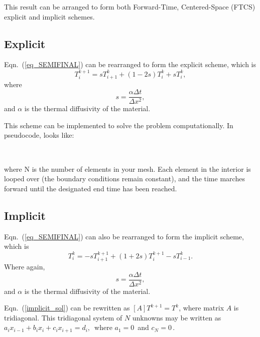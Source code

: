 \documentclass[twocolumn,10pt]{asme2ej}
\begin{document}
This result can be arranged to form both Forward-Time, Centered-Space (FTCS) explicit and implicit schemes.

\subsection{Explicit}
Eqn.~(\ref{eq_SEMIFINAL}) can be rearranged to form the explicit scheme, which is
\begin{equation}
T_i^{k+1} = sT_{i+1}^k +(1- 2s)T_i^k + sT_{i}^k,
\end{equation}
\noindent where
\begin{equation}
s = \frac{\alpha \Delta t}{\Delta x^2},
\end{equation}
\noindent and $\alpha$ is the thermal diffusivity of the material.

This scheme can be implemented to solve the problem computationally. In pseudocode, looks like: \\
\begin{algorithmic}
    \EndFor
\EndWhile \\
\end{algorithmic}
\noindent where N is the number of elements in your mesh. Each element in the interior is looped over (the boundary conditions remain constant), and the time marches forward until the designated end time has been reached.

\subsection{Implicit}
Eqn.~(\ref{eq_SEMIFINAL}) can also be rearranged to form the implicit scheme, which is
\begin{equation}
\label{implicit_sol}
T_i^k = -sT_{i+1}^{k+1} +(1+2s)T_i^{k+1} - sT_{i-1}^k.
\end{equation}
\noindent Where again,
\begin{equation}
s = \frac{\alpha \Delta t}{\Delta x^2},
\end{equation}
\noindent and $\alpha$ is the thermal diffusivity of the material.

Eqn.~(\ref{implicit_sol}) can be rewritten as $[A] T^{k+1} = T^k$, where matrix $A$ is tridiagonal. This tridiagonal system of $N$ unknowns may be written as $a_i x_{i - 1}  + b_i x_i  + c_i x_{i + 1}  = d_i , \,\!$ where $ a_1  = 0\, $ and $ c_N = 0\, $.
\end{document}
